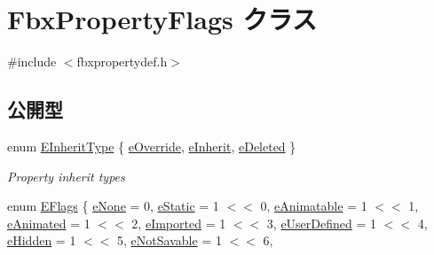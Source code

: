 \hypertarget{class_fbx_property_flags}{}\section{Fbx\+Property\+Flags クラス}
\label{class_fbx_property_flags}


{\ttfamily \#include $<$fbxpropertydef.\+h$>$}

\subsection*{公開型}
\begin{DoxyCompactItemize}
\item 
enum \hyperlink{class_fbx_property_flags_ae3b667a4fcac4b827fa186a698fec2f8}{E\+Inherit\+Type} \{ \hyperlink{class_fbx_property_flags_ae3b667a4fcac4b827fa186a698fec2f8af805230f7dd0e5f3c733869ab709f817}{e\+Override}, 
\hyperlink{class_fbx_property_flags_ae3b667a4fcac4b827fa186a698fec2f8a51d4e0da5672ca51938febe9e132c1cc}{e\+Inherit}, 
\hyperlink{class_fbx_property_flags_ae3b667a4fcac4b827fa186a698fec2f8ac5f760693c25af70c506b5880d015947}{e\+Deleted}
 \}\begin{DoxyCompactList}\small\item\em Property inherit types \end{DoxyCompactList}
\item 
enum \hyperlink{class_fbx_property_flags_afabfa7e0949aac8a7dcdf8a141867e99}{E\+Flags} \{ \newline
\hyperlink{class_fbx_property_flags_afabfa7e0949aac8a7dcdf8a141867e99ac1b9aab93d40af76eb419be426de17b1}{e\+None} = 0, 
\hyperlink{class_fbx_property_flags_afabfa7e0949aac8a7dcdf8a141867e99ad9782b0c0ceb7cc230e2ac64892e0e65}{e\+Static} = 1 $<$$<$ 0, 
\hyperlink{class_fbx_property_flags_afabfa7e0949aac8a7dcdf8a141867e99ae2c562a65bb942f3f94631794bc3d257}{e\+Animatable} = 1 $<$$<$ 1, 
\hyperlink{class_fbx_property_flags_afabfa7e0949aac8a7dcdf8a141867e99ab8c54dc36def6328df5a13f933033381}{e\+Animated} = 1 $<$$<$ 2, 
\newline
\hyperlink{class_fbx_property_flags_afabfa7e0949aac8a7dcdf8a141867e99ac4680bb4734c83c53007236d7eb7a73a}{e\+Imported} = 1 $<$$<$ 3, 
\hyperlink{class_fbx_property_flags_afabfa7e0949aac8a7dcdf8a141867e99abffff57ba6abd1b8fd1be2de602a57d5}{e\+User\+Defined} = 1 $<$$<$ 4, 
\hyperlink{class_fbx_property_flags_afabfa7e0949aac8a7dcdf8a141867e99a94d99bfd6951b4387776fea1bb328756}{e\+Hidden} = 1 $<$$<$ 5, 
\hyperlink{class_fbx_property_flags_afabfa7e0949aac8a7dcdf8a141867e99a11531771ac2c7b07d8b49641028f2b57}{e\+Not\+Savable} = 1 $<$$<$ 6, 
$$
\end{DoxyCompactItemize}
